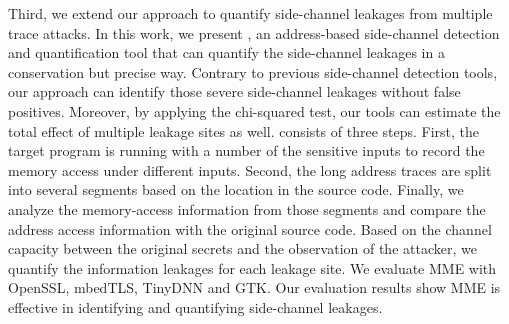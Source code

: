 Third, we extend our approach to quantify side-channel leakages from multiple trace attacks. In this work, we present \ctool{}, an address-based side-channel detection and quantification tool that can quantify the side-channel leakages in a conservation but precise way. Contrary to previous side-channel detection tools, our approach can identify those severe side-channel leakages without false positives. Moreover, by applying the chi-squared test, our tools can estimate the total effect of multiple leakage sites as well. \ctool{} consists of three steps. First, the target program is running with a number of the sensitive inputs to record the memory access under different inputs. Second, the long address traces are split into several segments based on the location in the source code. Finally, we analyze the memory-access information from those segments and compare the address access information with the original source code. Based on the channel capacity between the original secrets and the observation of the attacker, we quantify the information leakages for each leakage site. We evaluate MME with OpenSSL, mbedTLS, TinyDNN and GTK. Our evaluation results show MME is effective in identifying and quantifying side-channel leakages.
